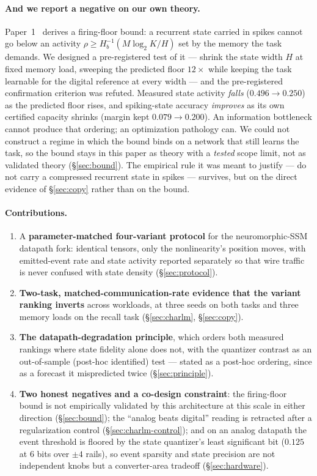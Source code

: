 \paragraph{And we report a negative on our own theory.} Paper~1~\citep{paper1} derives a
firing-floor bound: a recurrent state carried in spikes cannot go below an activity
$\rho \geq H_b^{-1}(M\log_2 K / H)$ set by the memory the task demands. We designed a
pre-registered test of it --- shrink the state width $H$ at fixed memory load, sweeping the
predicted floor $12\times$ while keeping the task learnable for the digital reference at every
width --- and the pre-registered confirmation criterion was refuted. Measured state activity
\emph{falls} ($0.496 \to 0.250$) as the predicted floor rises, and spiking-state accuracy
\emph{improves} as its own certified capacity shrinks (margin kept $0.079 \to 0.200$). An
information bottleneck cannot produce that ordering; an optimization pathology can. We could not
construct a regime in which the bound binds on a network that still learns the task, so the bound
stays in this paper as theory with a \emph{tested} scope limit, not as validated theory
(\S\ref{sec:bound}). The empirical rule it was meant to justify --- do not carry a compressed
recurrent state in spikes --- survives, but on the direct evidence of \S\ref{sec:copy} rather than
on the bound.

\paragraph{Contributions.}
\begin{enumerate}
  \item A \textbf{parameter-matched four-variant protocol} for the neuromorphic-SSM datapath fork:
    identical tensors, only the nonlinearity's position moves, with emitted-event rate and state
    activity reported separately so that wire traffic is never confused with state density
    (\S\ref{sec:protocol}).
  \item \textbf{Two-task, matched-communication-rate evidence that the variant ranking inverts}
    across workloads, at three seeds on both tasks and three memory loads on the recall task
    (\S\ref{sec:charlm}, \S\ref{sec:copy}).
  \item \textbf{The datapath-degradation principle}, which orders both measured rankings where
    state fidelity alone does not, with the quantizer contrast as an out-of-sample (post-hoc
    identified) test --- stated as a post-hoc ordering, since as a forecast it mispredicted
    twice (\S\ref{sec:principle}).
  \item \textbf{Two honest negatives and a co-design constraint}: the firing-floor bound is not
    empirically validated by this architecture at this scale in either direction
    (\S\ref{sec:bound}); the ``analog beats digital'' reading is retracted after a regularization
    control (\S\ref{sec:charlm-control}); and on an analog datapath the event threshold is floored
    by the state quantizer's least significant bit ($0.125$ at 6 bits over $\pm 4$ rails), so
    event sparsity and state precision are not independent knobs but a converter-area tradeoff
    (\S\ref{sec:hardware}).
\end{enumerate}

